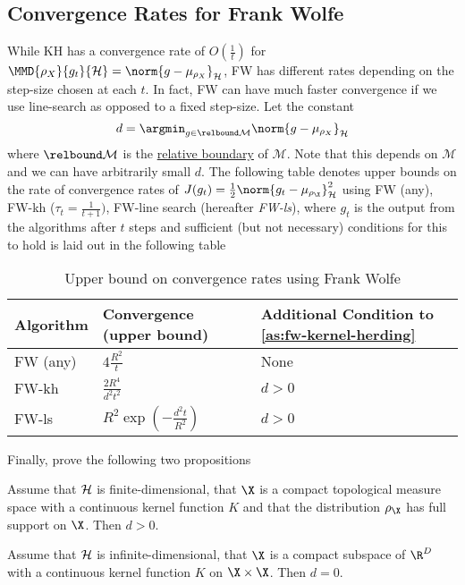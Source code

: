 \subsection{Convergence Rates for Frank Wolfe}
\label{sec:org9640d5f} While KH has a convergence rate of \(O(\frac{1}{t})\) for
\(\MMD{\rho_{X}}{g_t}{\rkhs{H}} = \norm{g - \mu_{\rho_{X}}}_{\rkhs{H}}\), FW
has different rates depending on the step-size chosen at each \(t\). In fact, FW
can have much faster convergence if we use line-search as opposed to a fixed
step-size. Let the constant
\begin{equation}
\label{eq:d-radius-of-biggest-interior-ball} d = \argmin_{g \in \relbound
\mathcal{M}} \norm{g - \mu_{\rho_X}}_{\rkhs{H}}
\end{equation} where \(\relbound \mathcal{M}\) is the
\hyperref[def:relative-boundary]{relative boundary} of \(\mathcal{M}\). Note
that this depends on \(\mathcal{M}\) and we can have arbitrarily small \(d\).
The following table denotes upper bounds on the rate of convergence rates of
\(J(g_{t}) = \frac{1}{2} \norm{g_{t} - \mu_{\rho_{\X}}}^{2}_{\rkhs{H}}\)
using FW (any), FW-kh (\(\tau_{t} =
\frac{1}{t+1})\), FW-line search (hereafter \emph{FW-ls}), where \(g_{t}\) is
the output from the algorithms after \(t\) steps and sufficient (but not
necessary) conditions for this to hold is laid out in the following table

\begin{table}[htbp]
\caption{\label{tbl:FW-convergence-table} Upper bound on convergence rates using
Frank Wolfe} \centering
\begin{tabular}{lll} \hline Algorithm & Convergence (upper bound) & Additional
Condition to \ref{as:fw-kernel-herding}\\ \hline FW (any) & \(4\frac{R^{2}}{t}\)
& None\\ FW-kh & \(\frac{2R^{4}}{d^{2}t^{2}}\) & \(d > 0\)\\ FW-ls & \(R^{2}
\exp(-\frac{d^{2}t}{R^{2}})\) & \(d > 0\)\\ \hline
\end{tabular}
\end{table}

Finally, \cite{bach12_equiv_between_herdin_condit_gradien_algor} prove the following two propositions
\begin{proposition}
\label{prop:finite-dim-fw-has-speedup} Assume that \(\mathcal{H}\) is
finite-dimensional, that \(\X\) is a compact topological measure space with a
continuous kernel function \(K\) and that the distribution \(\rho_{\X}\) has
full support on \(\X\). Then \(d > 0\).
\end{proposition}

\begin{proposition}
\label{prop:infinite-dim-fw-has-probably-not-speedup} Assume that \(\mathcal{H}\)
is infinite-dimensional, that \(\X\) is a compact subspace of \(\R^D\) with a
continuous kernel function \(K\) on \(\X \times \X\). Then \(d = 0\).
\end{proposition}
